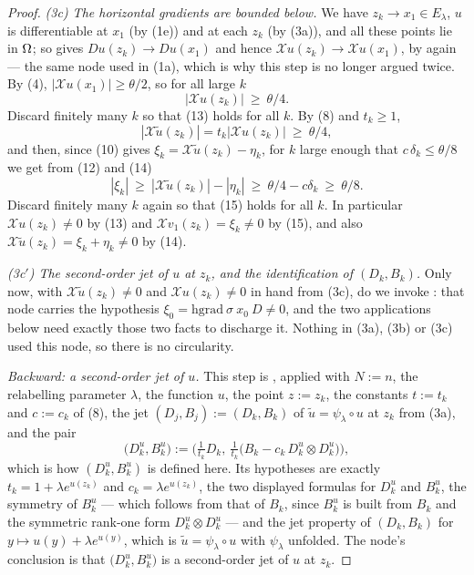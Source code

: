 \begin{proof}
\emph{(3c) The horizontal gradients are bounded below.} We have $z_k\to x_1\in E_\lambda$,
$u$ is differentiable at $x_1$ (by (1e)) and at each $z_k$ (by (3a)), and all these points
lie in $\Omega$; so  gives $Du(z_k)\to Du(x_1)$ and hence
$\mathcal Xu(z_k)\to\mathcal Xu(x_1)$, by  again --- the
same node used in (1a), which is why this step is no longer argued twice. By (4),
$|\mathcal Xu(x_1)|\ge\theta/2$, so for all large $k$
\[
 |\mathcal Xu(z_k)|\ \ge\ \theta/4 . \tag{13}
\]
Discard finitely many $k$ so that (13) holds for all $k$. By (8) and $t_k\ge1$,
\[
 |\mathcal X\tilde u(z_k)|=t_k|\mathcal Xu(z_k)|\ \ge\ \theta/4 , \tag{14}
\]
and then, since (10) gives $\xi_k=\mathcal X\tilde u(z_k)-\eta_k$, for $k$ large enough
that $c\,\delta_k\le\theta/8$ we get from (12) and (14)
\[
 |\xi_k|\ \ge\ |\mathcal X\tilde u(z_k)|-|\eta_k|\ \ge\ \theta/4-c\delta_k\ \ge\ \theta/8 .
 \tag{15}
\]
Discard finitely many $k$ again so that (15) holds for all $k$. In particular
$\mathcal Xu(z_k)\ne0$ by (13) and $\mathcal Xv_1(z_k)=\xi_k\ne0$ by (15), and also
$\mathcal X\tilde u(z_k)=\xi_k+\eta_k\ne0$ by (14).

\emph{(3c$'$) The second-order jet of $u$ at $z_k$, and the identification of
$(D_k,B_k)$.} Only now, with $\mathcal X\tilde u(z_k)\ne0$ and $\mathcal Xu(z_k)\ne0$ in
hand from (3c), do we invoke : that node carries the
hypothesis $\xi_0=\mathrm{hgrad}\ \sigma\ x_0\ D\ne0$, and the two applications below need
exactly those two facts to discharge it. Nothing in (3a), (3b) or (3c) used this node, so
there is no circularity.

\emph{Backward: a second-order jet of $u$.} This step is
, applied with $N:=n$, the relabelling parameter
$\lambda$, the function $u$, the point $z:=z_k$, the constants $t:=t_k$ and $c:=c_k$ of (8),
the jet $(D_j,B_j):=(D_k,B_k)$ of $\tilde u=\psi_\lambda\circ u$ at $z_k$ from (3a), and the
pair
\[
 \big(D^{u}_k,B^{u}_k\big):=\Big(\tfrac1{t_k}D_k,\
   \tfrac1{t_k}\big(B_k-c_k\,D^{u}_k\otimes D^{u}_k\big)\Big),
\]
which is how $(D^{u}_k,B^{u}_k)$ is defined here. Its hypotheses are exactly
$t_k=1+\lambda e^{u(z_k)}$ and $c_k=\lambda e^{u(z_k)}$, the two displayed formulas for
$D^{u}_k$ and $B^{u}_k$, the symmetry of $B^{u}_k$ --- which follows from that of $B_k$,
since $B^{u}_k$ is built from $B_k$ and the symmetric rank-one form
$D^{u}_k\otimes D^{u}_k$ --- and the jet property of $(D_k,B_k)$ for
$y\mapsto u(y)+\lambda e^{u(y)}$, which is $\tilde u=\psi_\lambda\circ u$ with
$\psi_\lambda$ unfolded. The node's conclusion is that $\big(D^{u}_k,B^{u}_k\big)$ is a
second-order jet of $u$ at $z_k$.


\end{proof}

